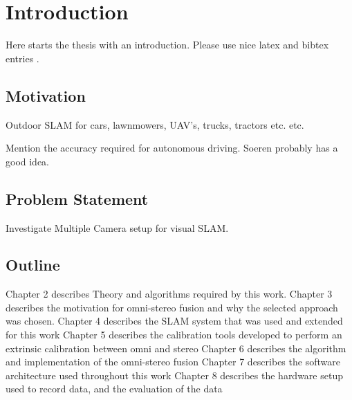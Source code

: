 \chapter{Introduction}
\label{chapter:Introduction}

Here starts the thesis with an introduction. Please use nice latex and bibtex entries \cite{latex}. 

\section{Motivation}

Outdoor SLAM for cars, lawnmowers, UAV's, trucks, tractors etc. etc.

Mention the accuracy required for autonomous driving.  Soeren probably has a good idea.

\section{Problem Statement}

Investigate Multiple Camera setup for visual SLAM.

\section{Outline}
 
Chapter 2 describes Theory and algorithms required by this work.  \newline
Chapter 3 describes the motivation for omni-stereo fusion and why the selected approach was chosen.
\newline
Chapter 4 describes the SLAM system that was used and extended for this work \newline
Chapter 5 describes the calibration tools developed to perform an extrinsic calibration between omni and stereo\newline
Chapter 6 describes the algorithm and implementation of the omni-stereo fusion \newline
Chapter 7 describes the software architecture used throughout this work \newline
Chapter 8 describes the hardware setup used to record data, and the evaluation of the data\newline
